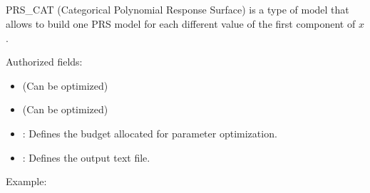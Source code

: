 \documentclass[letterpaper,10pt,english]{sphinxmanual}
\begin{document}
\subsection{}
\label{\detokenize{SgteLib:prs-cat}}\label{\detokenize{SgteLib:id3}}
\begin{DUlineblock}{0em}
\item[] PRS\_CAT (Categorical Polynomial Response Surface) is a type of model that allows to build one PRS model for each different value of the first component of \(x\).
\item[] Authorized fields:
\end{DUlineblock}
\begin{itemize}
\item {} 
\sphinxAtStartPar
{\hyperref[\detokenize{SgteLib:degree}]{}} (Can be optimized)

\item {} 
\sphinxAtStartPar
{\hyperref[\detokenize{SgteLib:ridge}]{}} (Can be optimized)

\item {} 
\sphinxAtStartPar
{\hyperref[\detokenize{SgteLib:budget}]{}}: Defines the budget allocated for parameter optimization.

\item {} 
\sphinxAtStartPar
{\hyperref[\detokenize{SgteLib:output}]{}}: Defines the output text file.

\end{itemize}

\begin{DUlineblock}{0em}
\item[] Example:
\item[] 
\item[] 
\end{DUlineblock}
\end{document}
